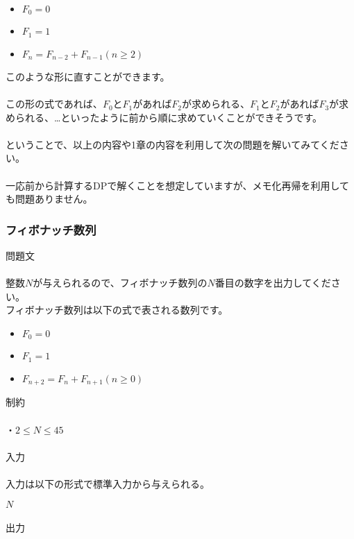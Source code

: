 \begin{itemize}
    \item $F_0 = 0$
    \item $F_1 = 1$
    \item $F_{n} = F_{n-2} + F_{n-1}(n \geq 2)$
\end{itemize}

\noindent
このような形に直すことができます。
\\ \\ \noindent
この形の式であれば、$F_0$と$F_1$があれば$F_2$が求められる、$F_1$と$F_2$があれば$F_3$が求められる、…といったように前から順に求めていくことができそうです。
\\ \\ \noindent
ということで、以上の内容や1章の内容を利用して次の問題を解いてみてください。
\\ \\ \noindent
一応前から計算するDPで解くことを想定していますが、メモ化再帰を利用しても問題ありません。

\clearpage

\subsubsection{フィボナッチ数列}
\noindent
{\LARGE 問題文}\\ \hrulefill \\

\noindent
整数$N$が与えられるので、フィボナッチ数列の$N$番目の数字を出力してください。\\
フィボナッチ数列は以下の式で表される数列です。

\begin{itemize}
    \item $F_0 = 0$
    \item $F_1 = 1$
    \item $F_{n+2} = F_{n} + F_{n+1}(n \geq 0)$
\end{itemize}

\noindent
{\LARGE 制約}\\ \hrulefill \\

\noindent
・$2 \leq N \leq 45$
\\ \\
\noindent
{\LARGE 入力}\\ \hrulefill \\

\noindent
入力は以下の形式で標準入力から与えられる。 

\noindent
$N$
\\ \\
\noindent
{\LARGE 出力}\\ \hrulefill \\

